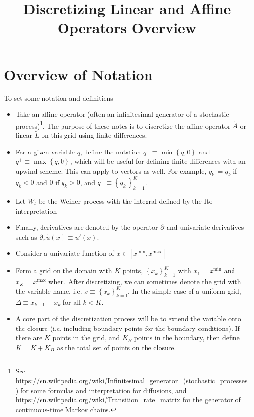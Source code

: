 \documentclass[11pt]{article}
\newcommand{\set}[1]{\ensuremath{\left\{{#1}\right\}}}
\newcommand{\D}[1][]{\ensuremath{\partial_{#1}}}
\begin{document}
	\title{Discretizing Linear and Affine Operators Overview}
	\author{}
	\date{}
	\maketitle
	\section{Overview of Notation}
	To set some notation and definitions
	\begin{itemize}
		\item Take an affine operator (often an infinitesimal generator of a stochastic process)\footnote{See \url{https://en.wikipedia.org/wiki/Infinitesimal_generator_(stochastic_processes)} for some formulas and interpretation for diffusions, and \url{https://en.wikipedia.org/wiki/Transition_rate_matrix} for the generator of continuous-time Markov chains.}.  The purpose of these notes is to discretize the affine operator  $\tilde{A}$ or linear $\tilde{L}$ on this grid using finite differences.
		\item For a given variable $q$, define the notation $q^{-} \equiv \min\set{q,0}$ and $q^{+} \equiv \max\set{q,0}$, which will be useful for defining finite-differences with an upwind scheme.  This can apply to vectors as well. For example, $q_k^{-} = q_k$ if $q_k < 0$ and $0$ if $q_k > 0$, and $q^{-} \equiv \set{q^{-}_k}_{k=1}^{K}$.
		\item Let $W_t$ be the Weiner process with the integral defined by the Ito interpretation
		\item Finally, derivatives are denoted by the operator $\D$ and univariate derivatives such as $\D[x]\tilde{u}(x) \equiv u'(x)$.
		\item Consider a univariate function of $x \in [x^{\min}, x^{\max}]$
		\item Form a grid on the domain with $K$ points, $\set{x_k}_{k=1}^{K}$ with $x_1 = x^{\min}$ and $x_{K} = x^{\max}$ when. After discretizing, we can sometimes denote the grid with the variable name, i.e. $x \equiv \set{x_k}_{k=1}^{K}$. In the simple case of a uniform grid, $\Delta \equiv x_{k+1} - x_k$ for all $k < K$.
		\item A core part of the discretization process will be to extend the variable onto the closure (i.e. including boundary points for the boundary conditions).  If there are $K$ points in the grid, and $K_B$ points in the boundary, then define $\bar{K} = K + K_B$ as the total set of points on the closure.

\end{itemize}
\end{document}

